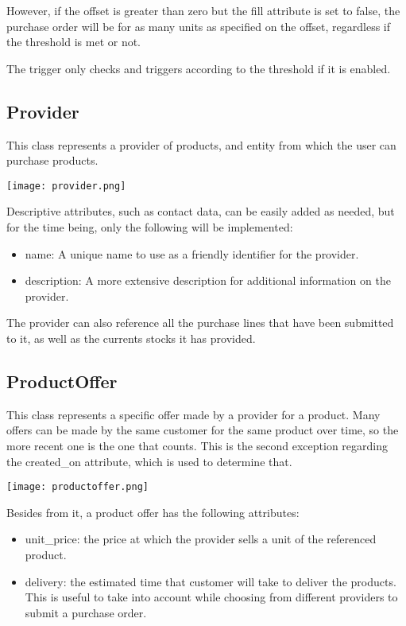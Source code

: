 However, if the offset is greater than zero but the fill attribute is set to false, the purchase order will be for as many units as specified on the offset, regardless if the threshold is met or not.

The trigger only checks and triggers according to the threshold if it is enabled.

\subsection{Provider}
This class represents a provider of products, and entity from which the user can purchase products. 
\begin{center}
\texttt{[image: provider.png]}
\end{center}
Descriptive attributes, such as contact data, can be easily added as needed, but for the time being, only the following will be implemented:

\begin{itemize}
\item name: A unique name to use as a friendly identifier for the provider.
\item description: A more extensive description for additional information on the provider.
\end{itemize}

The provider can also reference all the purchase lines that have been submitted to it, as well as the currents stocks it has provided.

\subsection{ProductOffer}
This class represents a specific offer made by a provider for a product. Many offers can be made by the same customer for the same product over time, so the more recent one is the one that counts. This is the second exception regarding the created\_on attribute, which is used to determine that.
\begin{center}
\texttt{[image: productoffer.png]}
\end{center}
Besides from it, a product offer has the following attributes:

\begin{itemize}
\item unit\_price: the price at which the provider sells a unit of the referenced product.
\item delivery: the estimated time that customer will take to deliver the products. This is useful to take into account while choosing from different providers to submit a purchase order.
\end{itemize}

